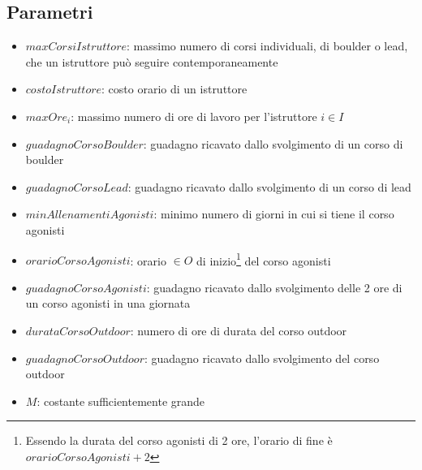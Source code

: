 \subsection{Parametri}
\begin{itemize}
	\item $maxCorsiIstruttore$: massimo numero di corsi individuali, di boulder o lead, che un istruttore può seguire contemporaneamente
	\item $costoIstruttore$: costo orario di un istruttore
	\item $maxOre_i$: massimo numero di ore di lavoro per l'istruttore $i \in I$
	\item $guadagnoCorsoBoulder$: guadagno ricavato dallo svolgimento di un corso di boulder
	\item $guadagnoCorsoLead$: guadagno ricavato dallo svolgimento di un corso di lead
	\item $minAllenamentiAgonisti$: minimo numero di giorni in cui si tiene il corso agonisti
	\item $orarioCorsoAgonisti$: orario $\in O$ di inizio\footnote{Essendo la durata del corso agonisti di 2 ore, l'orario di fine è $orarioCorsoAgonisti + 2$} del corso agonisti
	\item $guadagnoCorsoAgonisti$: guadagno ricavato dallo svolgimento delle 2 ore di un corso agonisti in una giornata
	\item $durataCorsoOutdoor$: numero di ore di durata del corso outdoor
	\item $guadagnoCorsoOutdoor$: guadagno ricavato dallo svolgimento del corso outdoor
	\item $M$: costante sufficientemente grande
\end{itemize}

